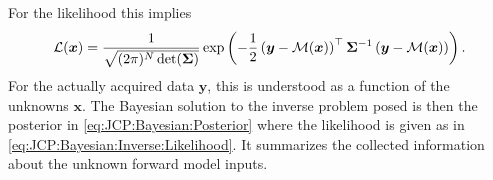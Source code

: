 For the likelihood this implies
\begin{equation} \label{eq:JCP:Bayesian:Inverse:Likelihood}
  \mathcal{L}(\bm{x}) = \frac{1}{\sqrt{(2\pi)^{N} \det(\bm{\Sigma})}}
  \exp \left( - \frac{1}{2} \left( \bm{y}-\mathcal{M}(\bm{x}) \right)^\top \bm{\Sigma}^{-1} \left( \bm{y}-\mathcal{M}(\bm{x}) \right) \right).
\end{equation}
For the actually acquired data \(\bm{y}\), this is understood as a function of the unknowns \(\bm{x}\).
The Bayesian solution to the inverse problem posed is then the posterior in \cref{eq:JCP:Bayesian:Posterior} where the likelihood is given as in \cref{eq:JCP:Bayesian:Inverse:Likelihood}.
It summarizes the collected information about the unknown forward model inputs.

